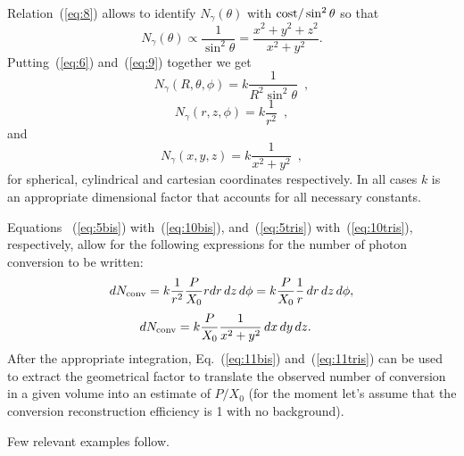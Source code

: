 Relation~(\ref{eq:8}) allows to identify $N_\gamma(\theta)$ with ${\rm cost}/\sin^2{\theta}$ so that
\begin{equation}
N_\gamma(\theta) \propto \frac{1}{\sin^2 \theta} = \frac{x^2+y^2+z^2}{x^2+y^2}.
\label{eq:9}
\end{equation}
Putting~(\ref{eq:6}) and~(\ref{eq:9}) together we get 
\begin{equation}
N_{\gamma} (R, \theta, \phi) = k \frac{1}{R^2\sin^2 \theta} \, \, \, ,
\label{eq:10pre}
\end{equation}
\begin{equation}
N_{\gamma} (r, z, \phi) = k \frac{1}{r^2} \,\,\, ,
\label{eq:10bis}
\end{equation}
and
\begin{equation}
N_{\gamma} (x, y, z) = k \frac{1}{x^2+y^2} \,\,\, ,
\label{eq:10tris}
\end{equation}
for spherical,
cylindrical and cartesian coordinates
respectively. In all cases $k$ is an appropriate dimensional factor
that accounts for all necessary constants.

Equations
~(\ref{eq:5bis})
with~(\ref{eq:10bis}), and~(\ref{eq:5tris}) with~(\ref{eq:10tris}),
respectively, allow for the following expressions for the number of photon
conversion to be written:
\begin{equation}
d N_{\rm conv} = k \frac{1}{r^2} 
\frac{P}{X_0} r dr\, dz\, d\phi = k
\frac{P}{X_0} \frac{1}{r}\, dr\, dz\, d\phi ,
\label{eq:11bis}
\end{equation}
\begin{equation}
\begin{split}
d N_{\rm conv} & = k \frac{P}{X_0} \frac{1}{x^2+y^2} \,dx\,dy\,dz .
\end{split}
\label{eq:11tris}
\end{equation}
After the appropriate integration,
Eq.~(\ref{eq:11bis}) and~(\ref{eq:11tris}) can be used to extract the
geometrical factor to translate the observed number of conversion in a given 
volume into an estimate of $P/X_0$ (for the moment let's assume that
the conversion reconstruction efficiency is 1 with no background).

Few relevant examples follow.

